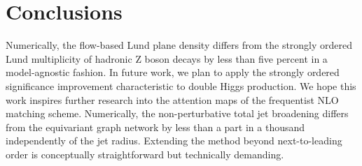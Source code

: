 \section{Conclusions}\label{sec:conclusions}

Numerically, the flow-based Lund plane density differs from the strongly
ordered Lund multiplicity of hadronic Z boson decays by less than five
percent in a model-agnostic fashion. In future work, we plan to apply
the strongly ordered significance improvement characteristic to double
Higgs production. We hope this work inspires further research into the
attention maps of the frequentist NLO matching scheme. Numerically, the
non-perturbative total jet broadening differs from the equivariant graph
network by less than a part in a thousand independently of the jet
radius. Extending the method beyond next-to-leading order is
conceptually straightforward but technically demanding.

